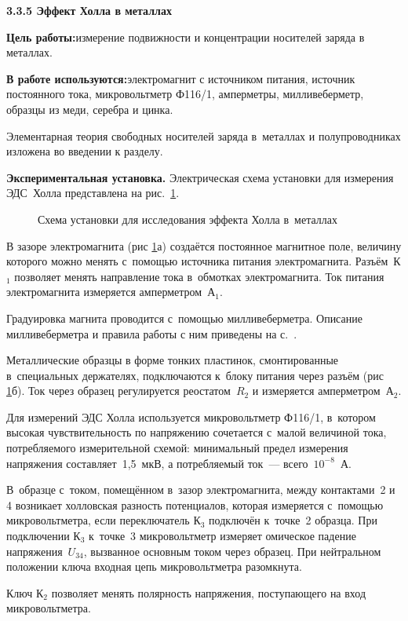 {\large \bf 3.3.5 Эффект Холла в металлах}

{\bf Цель работы:}{измерение подвижности и концентрации носителей заряда в металлах.}

{\bf В работе используются:}{электромагнит с источником питания, источник постоянного тока, микровольтметр Ф116/1, амперметры, милливеберметр,
образцы из меди, серебра и цинка.}

Элементарная теория свободных носителей заряда в~металлах и полупроводниках изложена во введении к разделу.

{\bf Экспериментальная установка.} Электрическая схема установки для измерения ЭДС~Холла представлена на рис.~\ref{fig3.5.1}.

\begin{figure}
\caption{Схема установки для исследования эффекта Холла в~металлах}
\label{fig3.5.1}
\end{figure}

В зазоре электромагнита (рис \ref{fig3.5.1}а) создаётся постоянное магнитное поле, величину которого можно менять с~помощью источника питания электромагнита. Разъём~К$_1$ позволяет менять направление тока в~обмотках электромагнита. Ток питания электромагнита измеряется амперметром~А$_1$.

Градуировка магнита проводится с~помощью милливеберметра. Описание милливеберметра и правила работы с ним приведены на с.~\pageref{MWB}.

Металлические образцы в форме тонких пластинок, смонтированные в~специальных держателях, подключаются к~блоку питания через разъём (рис \ref{fig3.5.1}б). Ток через образец регулируется реостатом~$R_2$ и измеряется амперметром~А$_2$.

Для измерений ЭДС Холла используется микровольтметр Ф116/1, в~котором высокая чувствительность по напряжению сочетается с~малой величиной тока, потребляемого измерительной схемой: минимальный предел измерения напряжения составляет~1,5~мкВ, а потребляемый ток~--- всего~$10^{-8}$~А.

В~образце с~током, помещённом в~зазор электромагнита, между контактами~2 и 4 возникает холловская разность потенциалов, которая измеряется с~помощью микровольтметра, если переключатель К$_3$ подключён к~точке~2 образца. При подключении К$_3$ к~точке~3 микровольтметр измеряет омическое падение напряжения~$U_{34}$, вызванное основным током через образец. При нейтральном положении ключа входная цепь микровольтметра разомкнута.

Ключ К$_2$ позволяет менять полярность напряжения, поступающего на вход микровольтметра.

